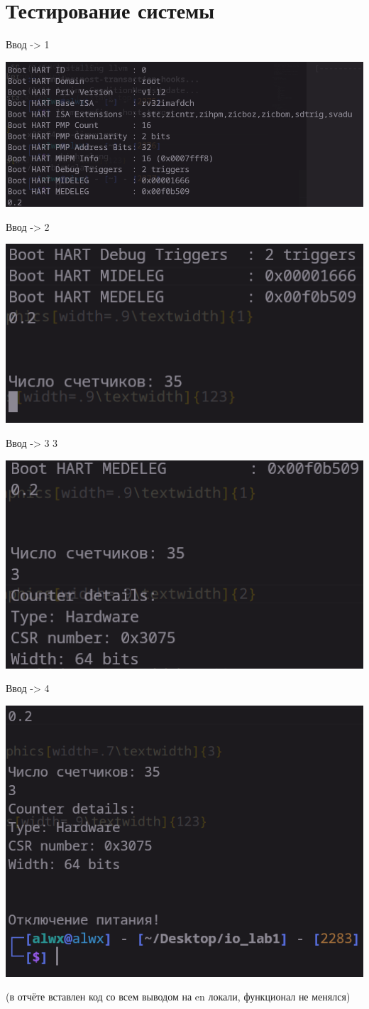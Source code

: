 \documentclass{article}
\begin{document}
\section{Тестирование системы}
Ввод -> 1
\begin{center}
    \includegraphics[width=.9\textwidth]{1}
\end{center}

Ввод -> 2
\begin{center}
    \includegraphics[width=.7\textwidth]{2}
\end{center}


Ввод -> 3 3
\begin{center}
    \includegraphics[width=.7\textwidth]{3}
\end{center}

Ввод -> 4 
\begin{center}
    \includegraphics[width=.7\textwidth]{4}
\end{center}
(в отчёте вставлен код со всем выводом на en локали, функционал не менялся)
\end{document}
